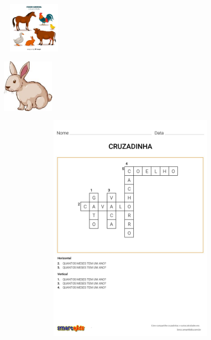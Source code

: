 \includegraphics[width=1.25000in,height=0.99097in]{media/image94.jpg}

\includegraphics[width=0.99722in,height=1.03125in]{media/image95.jpg}

\includegraphics[width=5.90556in,height=4.47101in]{media/image96.jpg}



